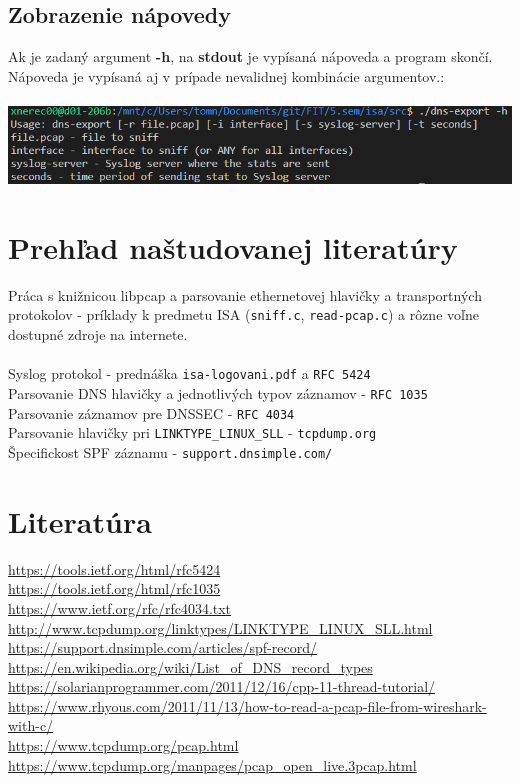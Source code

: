 \documentclass{article}
\begin{document}
        \subsection{Zobrazenie nápovedy}
        \noindent
        Ak je zadaný argument \textbf{-h}, na \textbf{stdout} je vypísaná nápoveda a program skončí. Nápoveda je vypísaná
        aj v prípade nevalidnej kombinácie argumentov.:\\\\
        \includegraphics[scale=0.6]{help.png}
    
    \newpage
    \section{Prehľad naštudovanej literatúry}
        \noindent
        Práca s knižnicou libpcap a parsovanie ethernetovej hlavičky a transportných protokolov - príklady
        k predmetu ISA (\texttt{sniff.c}, \texttt{read-pcap.c}) a rôzne voľne dostupné zdroje na internete.\\\\
        Syslog protokol - prednáška \texttt{isa-logovani.pdf} a \texttt{RFC 5424}\\ 
        Parsovanie DNS hlavičky a jednotlivých typov záznamov - \texttt{RFC 1035}\\
        Parsovanie záznamov pre DNSSEC - \texttt{RFC 4034}\\
        Parsovanie hlavičky pri \texttt{LINKTYPE\_LINUX\_SLL} - \texttt{tcpdump.org}\\
        Špecifickost SPF záznamu - \texttt{support.dnsimple.com/}
    
    \section{Literatúra}
    \noindent
    \url{https://tools.ietf.org/html/rfc5424}\\
    \url{https://tools.ietf.org/html/rfc1035}\\
    \url{https://www.ietf.org/rfc/rfc4034.txt}\\
    \url{http://www.tcpdump.org/linktypes/LINKTYPE_LINUX_SLL.html}\\
    \url{https://support.dnsimple.com/articles/spf-record/}\\
    \url{https://en.wikipedia.org/wiki/List_of_DNS_record_types}\\
    \url{https://solarianprogrammer.com/2011/12/16/cpp-11-thread-tutorial/}\\
    \url{https://www.rhyous.com/2011/11/13/how-to-read-a-pcap-file-from-wireshark-with-c/}\\
    \url{https://www.tcpdump.org/pcap.html}\\
    \url{https://www.tcpdump.org/manpages/pcap_open_live.3pcap.html}\\
\end{document}
